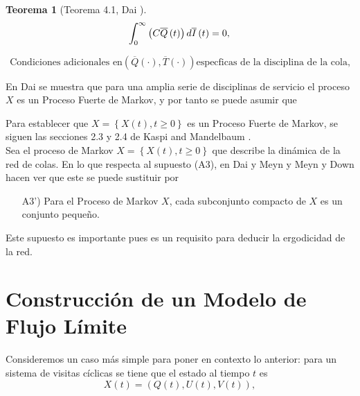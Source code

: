 \documentclass{article}
\newtheorem{Teo}{Teorema}[section]
\numberwithin{equation}{section}
\begin{document}
\begin{Teo}[Teorema 4.1, Dai \cite{Dai}]
\begin{equation}\label{Eq.MF.5.3a}
\int_{0}^{\infty}\left(C\overline{Q}\left(t\right)\right)d\overline{I}\left(t\right)=0,\\
\end{equation}

\begin{equation}\label{Eq.MF.6.3a}
\textrm{Condiciones adicionales en
}\left(\overline{Q}\left(\cdot\right),\overline{T}\left(\cdot\right)\right)\textrm{
especficas de la disciplina de la cola,}
\end{equation}
\end{Teo}


En Dai \cite{Dai} se muestra que para una amplia serie de disciplinas
de servicio el proceso $X$ es un Proceso Fuerte de
Markov, y por tanto se puede asumir que


Para establecer que $X=\left\{X\left(t\right),t\geq0\right\}$ es
un Proceso Fuerte de Markov, se siguen las secciones 2.3 y 2.4 de Kaspi and Mandelbaum \cite{KaspiMandelbaum}. \\

Sea el proceso de Markov $X=\left\{X\left(t\right),t\geq0\right\}$
que describe la din\'amica de la red de colas. En lo que respecta
al supuesto (A3), en Dai y Meyn \cite{DaiSean} y Meyn y Down
\cite{MeynDown} hacen ver que este se puede sustituir por

\begin{itemize}
\item[A3')] Para el Proceso de Markov $X$, cada subconjunto
compacto de $X$ es un conjunto peque\~no.
\end{itemize}

Este supuesto es importante pues es un requisito para deducir la ergodicidad de la red.
\section{Construcci\'on de un Modelo de Flujo L\'imite}

Consideremos un caso m\'as simple para poner en contexto lo
anterior: para un sistema de visitas c\'iclicas se tiene que el
estado al tiempo $t$ es
\begin{equation}
X\left(t\right)=\left(Q\left(t\right),U\left(t\right),V\left(t\right)\right),
\end{equation}
\end{document}
